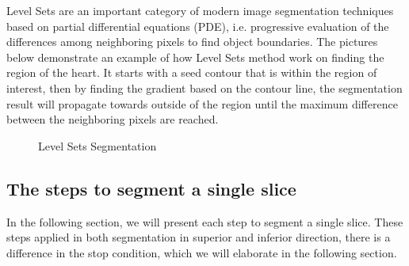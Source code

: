 Level Sets are an important category of modern image segmentation techniques based on partial differential equations (PDE), i.e. progressive evaluation of the differences among neighboring pixels to find object boundaries. The pictures below demonstrate an example of how Level Sets method work on finding the region of the heart. It starts with a seed contour that is within the region of interest, then by finding the gradient based on the contour line, the segmentation result will propagate towards outside of the region until the maximum difference between the neighboring pixels are reached.

\begin{figure}[H] 
\centering
{}%
%
%
\caption{Level Sets Segmentation}
\label{LSS}
\end{figure}

\subsection{The steps to segment a single slice}
In the following section, we will present each step to segment a single slice. These steps applied in both segmentation in superior and inferior direction, there is a difference in the stop condition, which we will elaborate in the following section.
